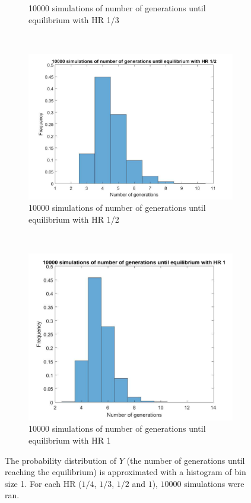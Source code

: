 \begin{figure}[H]
\begin{subfigure}{0.45\textwidth}
        \caption{10000 simulations of number of generations until equilibrium with HR 1/3}
        \label{hist hap 1/3}
    \end{subfigure}
	~
    \begin{subfigure}{0.45\textwidth}
        \includegraphics[width=\textwidth]{GenormHistogramAantalgen2.pdf}
        \caption{10000 simulations of number of generations until equilibrium with HR 1/2}
        \label{hist hap 1/2}
    \end{subfigure}
    ~
    \begin{subfigure}{0.45\textwidth}
        \includegraphics[width=\textwidth]{GenormHistogramAantalgen1.pdf}
        \caption{10000 simulations of number of generations until equilibrium with HR 1}
        \label{hist hap 1}
    \end{subfigure}
    \caption{The probability distribution of $Y$ (the number of generations until reaching the equilibrium) is approximated with a histogram of bin size 1. 
    For each HR ($1/4$, $1/3$, $1/2$ and $1$), $10000$ simulations were ran.}
    \label{fig:histogram}
\end{figure}

